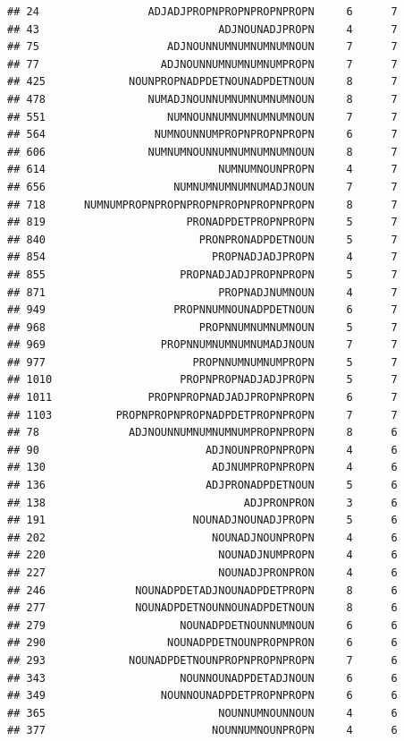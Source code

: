 \documentclass[]{article}
\begin{document}
\begin{verbatim}
## 24                 ADJADJPROPNPROPNPROPNPROPN     6      7
## 43                            ADJNOUNADJPROPN     4      7
## 75                    ADJNOUNNUMNUMNUMNUMNOUN     7      7
## 77                   ADJNOUNNUMNUMNUMNUMPROPN     7      7
## 425             NOUNPROPNADPDETNOUNADPDETNOUN     8      7
## 478                NUMADJNOUNNUMNUMNUMNUMNOUN     8      7
## 551                   NUMNOUNNUMNUMNUMNUMNOUN     7      7
## 564                 NUMNOUNNUMPROPNPROPNPROPN     6      7
## 606                NUMNUMNOUNNUMNUMNUMNUMNOUN     8      7
## 614                           NUMNUMNOUNPROPN     4      7
## 656                    NUMNUMNUMNUMNUMADJNOUN     7      7
## 718      NUMNUMPROPNPROPNPROPNPROPNPROPNPROPN     8      7
## 819                      PRONADPDETPROPNPROPN     5      7
## 840                        PRONPRONADPDETNOUN     5      7
## 854                          PROPNADJADJPROPN     4      7
## 855                     PROPNADJADJPROPNPROPN     5      7
## 871                           PROPNADJNUMNOUN     4      7
## 949                    PROPNNUMNOUNADPDETNOUN     6      7
## 968                        PROPNNUMNUMNUMNOUN     5      7
## 969                  PROPNNUMNUMNUMNUMADJNOUN     7      7
## 977                       PROPNNUMNUMNUMPROPN     5      7
## 1010                    PROPNPROPNADJADJPROPN     5      7
## 1011               PROPNPROPNADJADJPROPNPROPN     6      7
## 1103          PROPNPROPNPROPNADPDETPROPNPROPN     7      7
## 78              ADJNOUNNUMNUMNUMNUMPROPNPROPN     8      6
## 90                          ADJNOUNPROPNPROPN     4      6
## 130                          ADJNUMPROPNPROPN     4      6
## 136                         ADJPRONADPDETNOUN     5      6
## 138                               ADJPRONPRON     3      6
## 191                       NOUNADJNOUNADJPROPN     5      6
## 202                          NOUNADJNOUNPROPN     4      6
## 220                           NOUNADJNUMPROPN     4      6
## 227                           NOUNADJPRONPRON     4      6
## 246              NOUNADPDETADJNOUNADPDETPROPN     8      6
## 277              NOUNADPDETNOUNNOUNADPDETNOUN     8      6
## 279                     NOUNADPDETNOUNNUMNOUN     6      6
## 290                   NOUNADPDETNOUNPROPNPRON     6      6
## 293             NOUNADPDETNOUNPROPNPROPNPROPN     7      6
## 343                     NOUNNOUNADPDETADJNOUN     6      6
## 349                  NOUNNOUNADPDETPROPNPROPN     6      6
## 365                           NOUNNUMNOUNNOUN     4      6
## 377                          NOUNNUMNOUNPROPN     4      6

\end{verbatim}
\end{document}
